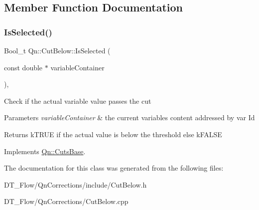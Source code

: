 \subsection{Member Function Documentation}
\mbox{\label{classQn_1_1CutBelow_ae7ea2216ffcf3e65c0dd89b04ff9bf21}} 
\subsubsection{\texorpdfstring{Is\+Selected()}{IsSelected()}}
{\footnotesize\ttfamily Bool\+\_\+t Qn\+::\+Cut\+Below\+::\+Is\+Selected (\begin{DoxyParamCaption}\item[{const double $\ast$}]{variable\+Container }\end{DoxyParamCaption})\hspace{0.3cm}{\ttfamily [inline]}, {\ttfamily [virtual]}}

Check if the actual variable value passes the cut


\begin{DoxyParams}{Parameters}
{\em variable\+Container} & the current variables content addressed by var Id \\
\hline
\end{DoxyParams}
\begin{DoxyReturn}{Returns}
k\+T\+R\+UE if the actual value is below the threshold else k\+F\+A\+L\+SE 
\end{DoxyReturn}


Implements \mbox{\hyperlink{classQn_1_1CutsBase_aab081fa4220144505ca838539d83aa8d}{Qn\+::\+Cuts\+Base}}.



The documentation for this class was generated from the following files\+:\begin{DoxyCompactItemize}
\item 
D\+T\+\_\+\+Flow/\+Qn\+Corrections/include/Cut\+Below.\+h\item 
D\+T\+\_\+\+Flow/\+Qn\+Corrections/Cut\+Below.\+cpp\end{DoxyCompactItemize}

